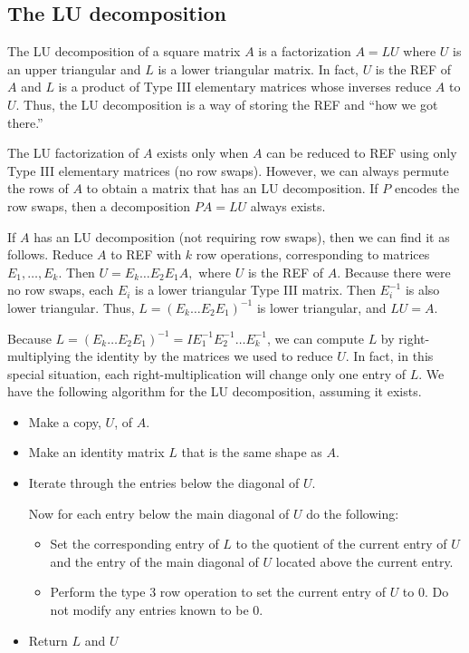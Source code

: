 \subsection*{The LU decomposition}
The LU decomposition of a square matrix $A$ is a factorization $A=LU$ where $U$ is an upper triangular and $L$ is a lower triangular matrix. In fact, $U$ is the REF of $A$ and $L$ is a product of Type III elementary matrices whose inverses reduce $A$ to $U$. Thus, the LU decomposition is a way of storing the REF and ``how we got there.''

The LU factorization of $A$ exists only when $A$ can be reduced to REF using only Type III elementary matrices (no row swaps). However, we can always permute the rows of $A$ to obtain a matrix that has an LU decomposition. If $P$ encodes the row swaps, then a decomposition $PA = LU$ always exists. 

If $A$ has an LU decomposition (not requiring row swaps), then we can find it as follows. Reduce $A$ to REF with $k$ row operations, corresponding to matrices $E_1, \ldots, E_k$. Then $U = E_k \ldots E_2E_1A,$ where $U$ is the REF of $A$. Because there were no row swaps, each $E_i$ is a lower triangular Type III matrix. Then $E_i^{-1}$ is also lower triangular. Thus, $L=(E_k \ldots E_2E_1)^{-1}$ is lower triangular, and $LU=A.$

Because $L=(E_k \ldots E_2E_1)^{-1} = IE_1^{-1}E_2^{-1}\ldots E_k^{-1}$, we can compute $L$ by right-multiplying the identity by the matrices we used to reduce $U$. 
In fact, in this special situation, each right-multiplication will change only one entry of $L$. 
We have the following algorithm for the LU decomposition, assuming it exists.

\begin{itemize}
\item Make a copy, $U$, of $A$.
\item Make an identity matrix $L$ that is the same shape as $A$.
\item Iterate through the entries below the diagonal of $U$.

Now for each entry below the main diagonal of $U$ do the following:
	\begin{itemize}
	\item Set the corresponding entry of $L$ to the quotient of the current entry of $U$ and the entry of the main diagonal of $U$ located above the current entry.
	\item Perform the type 3 row operation to set the current entry of $U$ to 0.
		Do not modify any entries known to be 0.
	\end{itemize}
\item Return $L$ and $U$
\end{itemize}

